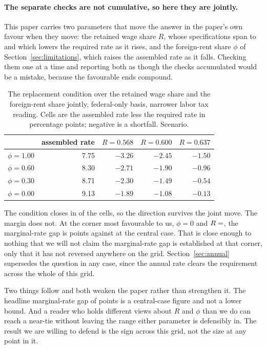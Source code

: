 \paragraph{The separate checks are not cumulative, so here they are jointly.} This paper carries
two parameters that move the answer in the paper's own favour when they move: the retained wage
share $R$, whose specifications span  to  and which lowers the
required rate as it rises, and the foreign-rent share $\phi$ of
Section~\ref{sec:limitations}, which raises the assembled rate as it falls. Checking them one at
a time and reporting both as though the checks accumulated would be a mistake, because the favourable ends compound.

\begin{table}[htbp]
\centering
\caption{The replacement condition over the retained wage share and the foreign-rent share
jointly, federal-only basis, narrower labor tax reading. Cells are the assembled rate less the
required rate in percentage points; negative is a shortfall. Scenario.}
\label{tab:joint}
\begin{tabular}{lrrrr}
\toprule
 & assembled rate & $R=0.568$ & $R=0.600$ & $R=0.637$ \\
\midrule
$\phi = 1.00$ & 7.75 & $-3.26$ & $-2.45$ & $-1.50$ \\
$\phi = 0.60$ & 8.30 & $-2.71$ & $-1.90$ & $-0.96$ \\
$\phi = 0.30$ & 8.71 & $-2.30$ & $-1.49$ & $-0.54$ \\
$\phi = 0.00$ & 9.13 & $-1.89$ & $-1.08$ & $-0.13$ \\
\bottomrule
\end{tabular}
\end{table}

The condition closes in  of the  cells, so the direction
survives the joint move. The margin does not. At the corner most favourable to us, $\phi = 0$ and
$R = \result{RSensHigh}$, the marginal-rate gap is  points against
 at the central case. That is close enough to nothing that we will not claim
the marginal-rate gap is established at that corner, only that it has not reversed anywhere on
the grid. Section~\ref{sec:annual} supersedes the question in any case, since the annual rate
clears the requirement across the whole of this grid.

Two things follow and both weaken the paper rather than strengthen it. The headline marginal-rate
gap of  points is a central-case figure and not a lower bound. And a reader who
holds different views about $R$ and $\phi$ than we do can reach a near-tie without leaving the
range either parameter is defensibly in. The result we are willing to defend is the sign across
this grid, not the size at any point in it.

